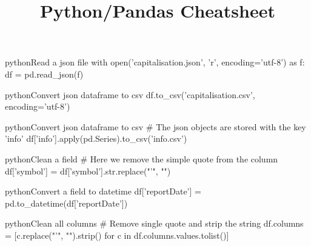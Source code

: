 \documentclass[10pt,a4paper]{article}
\title{\color{w3schools}Python/Pandas Cheatsheet
}
\begin{document}
\maketitle

\small
\begin{multicols}{3}

\thispagestyle{empty}
\scriptsize



\begin{codebox}{python}{Read a json file}
with open('capitalisation.json', 'r', encoding='utf-8') as f:
     df = pd.read_json(f)

\end{codebox}

\begin{codebox}{python}{Convert json dataframe to csv}
df.to_csv('capitalisation.csv', encoding='utf-8')

\end{codebox}

\begin{codebox}{python}{Convert json dataframe to csv}
# The json objects are stored with the key 'info'
df['info'].apply(pd.Series).to_csv('info.csv')

\end{codebox}

\begin{codebox}{python}{Clean a field}
# Here we remove the simple quote from the column 
df['symbol'] = df['symbol'].str.replace("'", "")

\end{codebox}

\begin{codebox}{python}{Convert a field to datetime}
df['reportDate'] = pd.to_datetime(df['reportDate'])

\end{codebox}

\begin{codebox}{python}{Clean all columns}
# Remove single quote and strip the string
df.columns = [c.replace("'", "").strip() for c in df.columns.values.tolist()]

\end{codebox}


\AtNextBibliography{\footnotesize}
\printbibliography  
\end{multicols}
\end{document}
